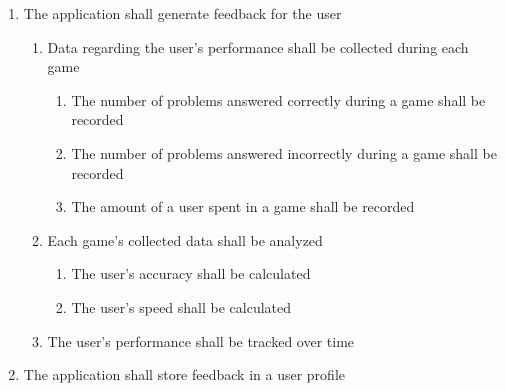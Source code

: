 \documentclass[12pt,letterpaper,oneside]{article}
\begin{document}
\begin{enumerate}
	\item	%
		The application shall generate feedback for the user
		\begin{enumerate}
			\item	%
				Data regarding the user's performance shall be collected during each game
				\begin{enumerate}
					\item	%
						The number of problems answered correctly during a game shall be recorded
					\item	%
						The number of problems answered incorrectly during a game shall be recorded
					\item	%
						The amount of a user spent in a game shall be recorded
				\end{enumerate}
			\item
				Each game's collected data shall be analyzed
				\begin{enumerate}
					\item	%
						The user's accuracy shall be calculated
					\item	%
						The user's speed shall be calculated
				\end{enumerate}
			\item	%
				The user's performance shall be tracked over time
		\end{enumerate}

	\item	%
		The application shall store feedback in a user profile


\end{enumerate}
\end{document}
